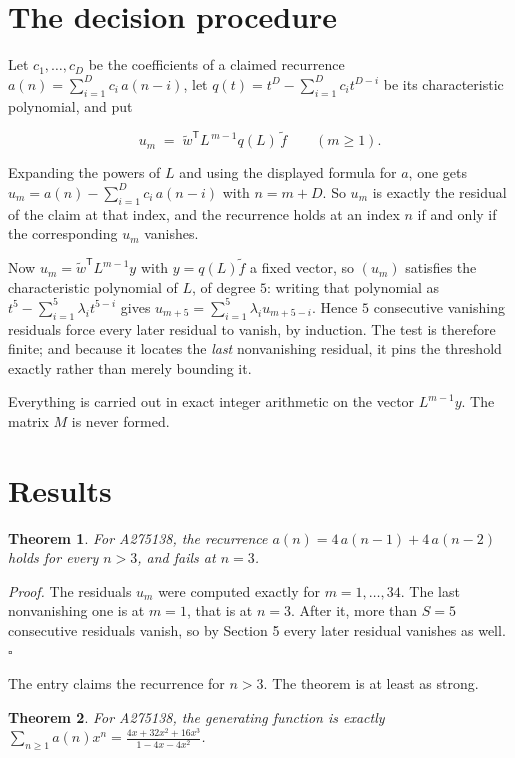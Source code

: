 \documentclass[11pt]{article}
\newtheorem{theorem}{Theorem}
\theoremstyle{definition}
\begin{document}
\section{The decision procedure}

Let $c_1,\dots,c_D$ be the coefficients of a claimed recurrence $a(n) = \sum_{i=1}^{D} c_i\,a(n-i)$, let $q(t) = t^{D} - \sum_{i=1}^{D} c_i t^{D-i}$ be its characteristic polynomial, and put

\[u_m \;=\; \tilde w^{\mathsf T} L^{\,m-1} q(L)\,\tilde f \qquad (m \ge 1).\]

Expanding the powers of $L$ and using the displayed formula for $a$, one gets $u_m = a(n) - \sum_{i=1}^{D} c_i\,a(n-i)$ with $n = m + D$. So $u_m$ is exactly the residual of the claim at that index, and the recurrence holds at an index $n$ if and only if the corresponding $u_m$ vanishes.

Now $u_m = \tilde w^{\mathsf T} L^{m-1} y$ with $y = q(L)\tilde f$ a fixed vector, so $(u_m)$ satisfies the characteristic polynomial of $L$, of degree $5$: writing that polynomial as $t^{5} - \sum_{i=1}^{5} \lambda_i t^{5-i}$ gives $u_{m+5} = \sum_{i=1}^{5} \lambda_i u_{m+5-i}$. Hence $5$ consecutive vanishing residuals force every later residual to vanish, by induction. The test is therefore finite; and because it locates the {\itshape last} nonvanishing residual, it pins the threshold exactly rather than merely bounding it.

Everything is carried out in exact integer arithmetic on the vector $L^{m-1}y$. The matrix $M$ is never formed.

\section{Results}

\begin{theorem} For A275138, the recurrence $a(n) = 4\,a(n-1) + 4\,a(n-2)$ holds for every $n > 3$, and fails at $n = 3$.\end{theorem}

{\itshape Proof.} The residuals $u_m$ were computed exactly for $m = 1,\dots,34$. The last nonvanishing one is at $m = 1$, that is at $n = 3$. After it, more than $S = 5$ consecutive residuals vanish, so by Section 5 every later residual vanishes as well. $\square$

The entry claims the recurrence for $n > 3$. The theorem is at least as strong.

\begin{theorem} For A275138, the generating function is exactly $\sum_{n\ge 1} a(n)x^n = \frac{4x + 32x^{2} + 16x^{3}}{1 - 4x - 4x^{2}}$.\end{theorem}
\end{document}
